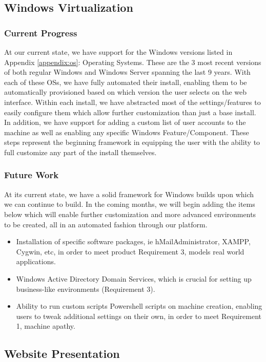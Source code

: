 \documentclass[openright]{report}
\begin{document}
\subsection{Windows Virtualization}

\subsubsection{Current Progress}
At our current state, we have support for the Windows versions listed in Appendix \ref{appendix:os}: Operating Systems. These are the 3 most recent versions of both regular Windows and Windows Server spanning the last 9 years. With each of these OSs, we have fully automated their install, enabling them to be automatically provisioned based on which version the user selects on the web interface. Within each install, we have abstracted most of the settings/features to easily configure them which allow further customization than just a base install. In addition, we have support for adding a custom list of user accounts to the machine as well as enabling any specific Windows Feature/Component. These steps represent the beginning framework in equipping the user with the ability to full customize any part of the install themselves.

\subsubsection{Future Work}
At its current state, we have a solid framework for Windows builds upon which we can continue to build. In the coming months, we will begin adding the items below which will enable further customization and more advanced environments to be created, all in an automated fashion through our platform.
\begin{itemize}
    \item Installation of specific software packages, ie hMailAdministrator, XAMPP, Cygwin, etc, in order to meet product Requirement 3, models real world applications.
    \item Windows Active Directory Domain Services, which is crucial for setting up business-like environments (Requirement 3).
    \item Ability to run custom scripts Powershell scripts on machine creation, enabling users to tweak additional settings on their own, in order to meet Requirement 1, machine apathy.
\end{itemize}

\subsection{Website Presentation}
\end{document}
